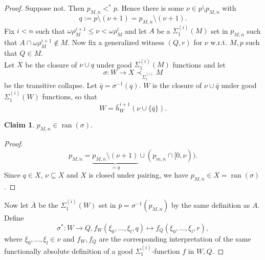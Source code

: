 \documentclass[12pt,a4paper]{article}
\theoremstyle{nicestyle}
\newtheorem{claim}{Claim}[subsection]
\newenvironment{proofblack}{\begin{proof}}
  {\renewcommand{\qedsymbol}{$\blacksquare$}\end{proof}}
\DeclareMathOperator{\ran}{ran}
\begin{document}
      \begin{proof}
        Suppose not. Then $p_{M,n} <^{*} p$. Hence there is some
        $\nu \in p \setminus p_{M,n}$ with
        \[
          q := p \setminus (\nu + 1) = p_{M,n} \setminus (\nu + 1).
        \]
        Fix $i < n$ such that
        $\omega\rho^{i+1}_{M} \le \nu < \omega\rho^{i}_{M}$ and let
        $A$ be a $\Sigma^{(i)}_{1}(M)$ set in $p_{M,n}$ such that
        $A \cap \omega\rho^{i+1}_{M} \not \in M$. Now fix a
        generalized witness $(Q,r)$ for $\nu$ w.r.t. $M,p$ such that
        $Q \in M$. \\
        Let $X$ be the closure of $\nu \cup q$ under good $\Sigma^{(i)}_{1}(M)$ functions and let
        \[
          \sigma \colon W \to X \prec_{\Sigma^{(i)}_{1}} M
        \]
        be the transitive collapse. Let $\bar{q} =
        \sigma^{-1}(q)$. $W$ is the closure of $\nu \cup \bar{q}$
        under good $\Sigma^{(i)}_{1}(W)$ functions, so that
        \[
          W = \bar{h}^{i+1}_{W}(\nu \cup \{\bar{q}\}).
        \]

        \begin{claim}
          $p_{M,n} \in \ran(\sigma)$.
        \end{claim}

        \begin{proofblack}
          \[
            p_{M,n} = \underbrace{p_{M,n} \setminus (\nu+1)}_{= q} \cup (p_{m,n} \cap [0,\nu)).
          \]
          Since $q \in X$, $\nu \subseteq X$ and $X$ is closed under
          pairing, we have $p_{M,n} \in X = \ran(\sigma)$.
        \end{proofblack}
        Now let $\bar{A}$ be the $\Sigma^{(i)}_{1}(W)$ set in
        $\bar{p} = \sigma^{-1}(p_{M,n})$ by the same definition as
        $A$. \\
        Define
        \[
          \sigma^{*} \colon W \to Q, f_{W}(\xi_{0}, \ldots, \xi_{l}, q) \mapsto f_{Q}(\xi_{0}, \ldots, \xi_{l}, r),
        \]
        where $\xi_{0}, \ldots, \xi_{l} \in \nu$ and $f_{W},f_{Q}$ are
        the corresponding interpretation of the same functionally
        absolute definition of a good $\Sigma^{(i)}_{1}$-function $f$
        in $W, Q$.


\end{proof}
\end{document}
